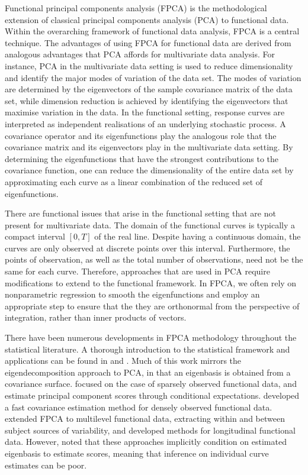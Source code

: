 \documentclass[12pt]{article}
\theoremstyle{plain}
\theoremstyle{definition}
\theoremstyle{remark}
\begin{document}
Functional principal components analysis (FPCA) is the methodological extension of classical principal
components analysis (PCA) to functional data. Within the overarching framework of functional data analysis,
FPCA is a central technique. The advantages of using FPCA for functional data are derived
from analogous advantages that PCA affords for multivariate data analysis. For instance, PCA in the multivariate
data setting is used to reduce dimensionality and identify the major modes of variation of the
data set. The modes of variation are determined by the eigenvectors of the sample covariance matrix of the data
set, while dimension reduction is achieved by identifying the eigenvectors that maximise variation in the data.
In the functional setting, response curves are interpreted as independent realisations of an underlying
stochastic process. A covariance operator and its eigenfunctions play the analogous
role that the covariance matrix and its eigenvectors play in the multivariate data setting. By determining the
eigenfunctions that have the strongest contributions to the covariance function, one can reduce the
dimensionality of the entire data set by approximating each curve as a linear combination of the reduced set
of eigenfunctions.

There are functional issues that arise in the functional setting that are not present for multivariate data.
The domain of the functional curves is typically a compact interval $[0, T]$ of the real line.
Despite having a continuous domain, the curves are only observed at discrete points over this interval.
Furthermore, the points of observation, as well as the total number of observations, need not be the
same for each curve. Therefore, approaches that are used in PCA require
modifications to extend to the functional framework.
In FPCA, we often rely on nonparametric regression to smooth the eigenfunctions and employ
an appropriate step to ensure that the they are orthonormal from the perspective of integration, rather
than inner products of vectors.

There have been numerous developments in FPCA methodology throughout the statistical literature.
A thorough introduction to the statistical framework and applications can be found in 
and . Much of this work mirrors the eigendecomposition approach to PCA, in that an
eigenbasis is obtained from a covariance surface.  focused on the case of sparsely observed functional
data, and estimate
principal component scores through conditional expectations.  developed a fast covariance estimation method for densely observed functional data.  extended FPCA to multilevel functional data, extracting within and
between subject sources of variability, and  developed methods for longitudinal functional data. However,
 noted that these approaches implicitly condition on estimated eigenbasis to estimate scores, meaning that inference on
individual curve estimates can be poor.
\end{document}

